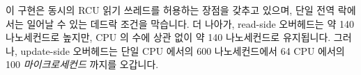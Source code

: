 이 구현은 동시의 RCU 읽기 쓰레드를 허용하는 장점을 갖추고 있으며, 단일 전역
락에서는 일어날 수 있는 데드락 조건을 막습니다.
더 나아가, read-side 오버헤드는 약 140 나노세컨드로 높지만, CPU 의 수에 상관
없이 약 140 나노세컨드로 유지됩니다.
그러나, update-side 오버헤드는 단일  CPU 에서의 600 나노세컨드에서 64
CPU 에서의 100 \emph{마이크로세컨드} 까지를 오갑니다.

\iffalse

This implementation does have the virtue of permitting concurrent
RCU readers, and does avoid the deadlock condition that can arise
with a single global lock.
Furthermore, the read-side overhead, though high at roughly 140 nanoseconds,
remains at about 140 nanoseconds regardless of the number of CPUs.
However, the update-side overhead ranges from about 600 nanoseconds
on a single \Power{5} CPU
up to more than 100 \emph{microseconds} on 64 CPUs.

\fi

